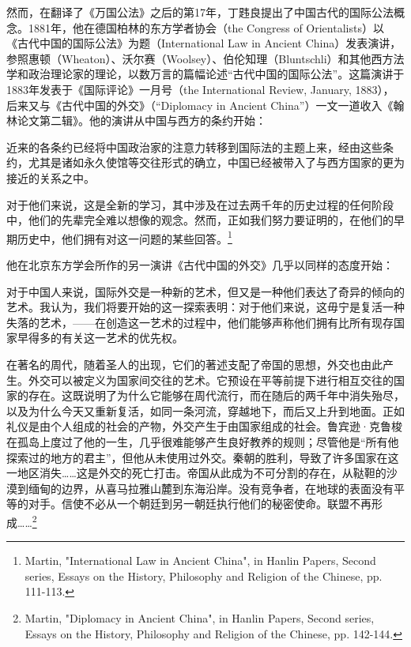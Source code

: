 \documentclass[a4paper, 12pt, openright]{ctexbook}
\renewenvironment{quote}
  {\list{}{\rightmargin2\ccwd \leftmargin2\ccwd \itemindent=2\ccwd \listparindent=2\ccwd}%
   \item\relax\small\kaishu\color{black}}
  {\endlist}
\begin{document}
然而，在翻译了《万国公法》之后的第17年，丁韪良提出了中国古代的国际公法概念。1881年，他在德国柏林的东方学者协会（the Congress of Orientalists）以《古代中国的国际公法》为题（International Law in Ancient China）发表演讲，参照惠顿（Wheaton）、沃尔赛（Woolsey）、伯伦知理（Bluntschli）和其他西方法学和政治理论家的理论，以数万言的篇幅论述“古代中国的国际公法”。这篇演讲于1883年发表于《国际评论》一月号（the International Review, January, 1883），后来又与《古代中国的外交》（“Diplomacy in Ancient China”）一文一道收入《翰林论文第二辑》。他的演讲从中国与西方的条约开始：

\begin{quote}
近来的各条约已经将中国政治家的注意力转移到国际法的主题上来，经由这些条约，尤其是诸如永久使馆等交往形式的确立，中国已经被带入了与西方国家的更为接近的关系之中。

对于他们来说，这是全新的学习，其中涉及在过去两千年的历史过程的任何阶段中，他们的先辈完全难以想像的观念。然而，正如我们努力要证明的，在他们的早期历史中，他们拥有对这一问题的某些回答。\footnote{Martin, "International Law in Ancient China", in Hanlin Papers, Second series, Essays on the History, Philosophy and Religion of the Chinese, pp. 111-113.}
\end{quote}

他在北京东方学会所作的另一演讲《古代中国的外交》几乎以同样的态度开始：

\begin{quote}
对于中国人来说，国际外交是一种新的艺术，但又是一种他们表达了奇异的倾向的艺术。我认为，我们将要开始的这一探索表明：对于他们来说，这毋宁是复活一种失落的艺术，——在创造这一艺术的过程中，他们能够声称他们拥有比所有现存国家早得多的有关这一艺术的优先权。

在著名的周代，随着圣人的出现，它们的著述支配了帝国的思想，外交也由此产生。外交可以被定义为国家间交往的艺术。它预设在平等前提下进行相互交往的国家的存在。这既说明了为什么它能够在周代流行，而在随后的两千年中消失殆尽，以及为什么今天又重新复活，如同一条河流，穿越地下，而后又上升到地面。正如礼仪是由个人组成的社会的产物，外交产生于由国家组成的社会。鲁宾逊·克鲁梭在孤岛上度过了他的一生，几乎很难能够产生良好教养的规则；尽管他是“所有他探索过的地方的君主”，但他从未使用过外交。秦朝的胜利，导致了许多国家在这一地区消失……这是外交的死亡打击。帝国从此成为不可分割的存在，从鞑靼的沙漠到缅甸的边界，从喜马拉雅山麓到东海沿岸。没有竞争者，在地球的表面没有平等的对手。信使不必从一个朝廷到另一朝廷执行他们的秘密使命。联盟不再形成……\footnote{Martin, "Diplomacy in Ancient China", in Hanlin Papers, Second series, Essays on the History, Philosophy and Religion of the Chinese, pp. 142-144.}
\end{quote}
\end{document}
